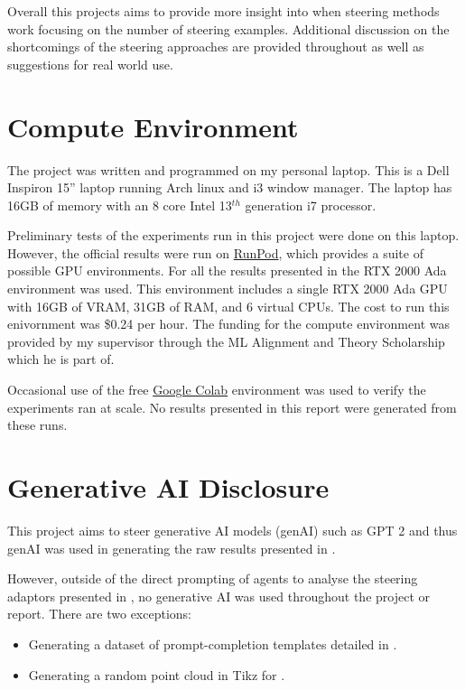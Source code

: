 Overall this projects aims to provide more insight into when steering methods work focusing on the number of steering examples.
Additional discussion on the shortcomings of the steering approaches are provided throughout as well as suggestions for real world use.

\section{Compute Environment}

The project was written and programmed on my personal laptop.
This is a Dell Inspiron 15'' laptop running Arch linux and i3 window manager.
The laptop has 16GB of memory with an 8 core Intel 13$^{th}$ generation i7 processor.

Preliminary tests of the experiments run in this project were done on this laptop.
However, the official results were run on \href{https://www.runpod.io/}{RunPod}, which provides a suite of possible GPU environments.
For all the results presented in  the RTX 2000 Ada environment was used.
This environment includes a single RTX 2000 Ada GPU with 16GB of VRAM, 31GB of RAM, and 6 virtual CPUs.
The cost to run this enivornment was \$0.24 per hour.
The funding for the compute environment was provided by my supervisor through the ML Alignment and Theory Scholarship \citep{mats} which he is part of.

Occasional use of the free \href{https://colab.research.google.com/}{Google Colab} environment was used to verify the experiments ran at scale.
No results presented in this report were generated from these runs.

\section{Generative AI Disclosure}

This project aims to steer generative AI models (genAI) such as GPT 2 \citep{gpt-2} and thus genAI was used in generating the raw results presented in .

However, outside of the direct prompting of agents to analyse the steering adaptors presented in , no generative AI was used throughout the project or report.
There are two exceptions:
\begin{itemize}[nolistsep]
    \item Generating a dataset of prompt-completion templates detailed in .
    \item Generating a random point cloud in Tikz for .
\end{itemize}

